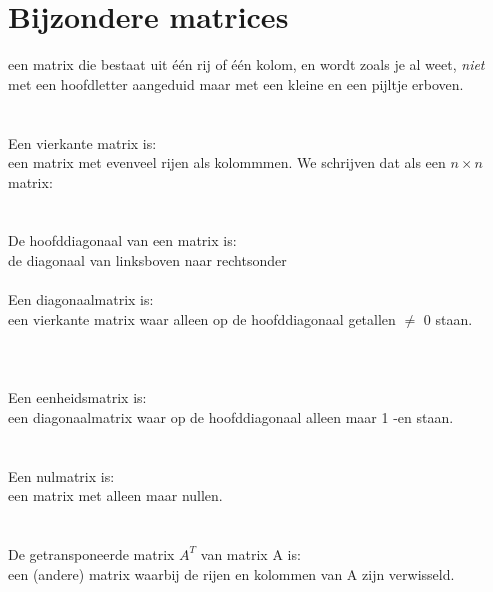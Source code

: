 \documentclass[hidelinks, a4wide, 12pt,  twoside]{book}
\begin{document}
\section{Bijzondere matrices}
{een matrix die bestaat uit één rij of één  kolom, en wordt zoals je al weet, \textit{niet} met een hoofdletter aangeduid maar met een kleine en een pijltje erboven.}\\
\\ \\
{Een vierkante matrix is:
	\\een matrix met evenveel rijen als kolommmen. We schrijven dat als een $ n \times n $ matrix:} 
  \\ \\ \\
{De hoofddiagonaal van een matrix is:
	\\de diagonaal van linksboven naar rechtsonder}
\\ \\ 
{Een diagonaalmatrix is:\\een vierkante matrix waar alleen op de hoofddiagonaal getallen $\ne$ 0 staan. }
\\ \\ \\ \\
{Een eenheidsmatrix  is:\\een diagonaalmatrix waar  op de hoofddiagonaal alleen maar 1 -en  staan. }
\\ \\ \\
{Een nulmatrix  is: \\een matrix met alleen maar nullen. }
 \\ \\ \\
{De getransponeerde matrix $ A^{T}  $ van matrix A is:\\
	een (andere) matrix waarbij de rijen en kolommen van A zijn verwisseld. } 
 \\ \\ \\ \\
\\
\end{document}
